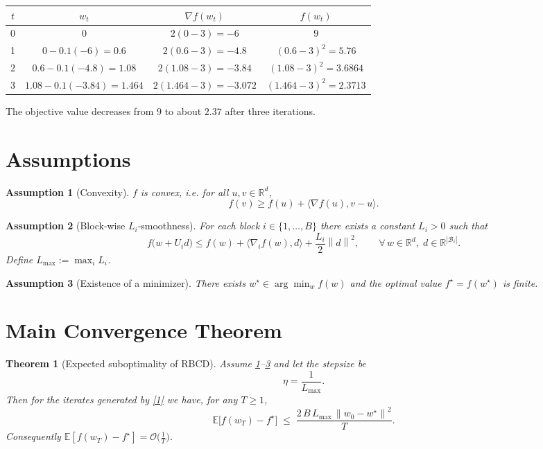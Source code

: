 \documentclass{article}
\newtheorem{theorem}{Theorem}
\newtheorem{assumption}{Assumption}
\newcommand{\E}{\mathbb{E}}
\newcommand{\R}{\mathbb{R}}
\newcommand{\norm}[1]{\left\lVert #1\right\rVert}
\newcommand{\ip}[2]{\langle #1 , #2\rangle}
\newcommand{\block}[1]{U_{#1}}
\begin{document}
\begin{center}
\begin{tabular}{c|c|c|c}
$t$ & $w_{t}$ & $\nabla f(w_{t})$ & $f(w_{t})$ \\ \hline
0 & $0$ & $2(0-3)=-6$ & $9$ \\
1 & $0-0.1(-6)=0.6$ & $2(0.6-3)=-4.8$ & $(0.6-3)^{2}=5.76$ \\
2 & $0.6-0.1(-4.8)=1.08$ & $2(1.08-3)=-3.84$ & $(1.08-3)^{2}=3.6864$ \\
3 & $1.08-0.1(-3.84)=1.464$ & $2(1.464-3)=-3.072$ & $(1.464-3)^{2}=2.3713$
\end{tabular}
\end{center}
The objective value decreases from $9$ to about $2.37$ after three iterations.

\newpage

\section*{Assumptions}
\begin{assumption}[Convexity]\label{as:convex}
$f$ is convex, i.e. for all $u,v\in\R^{d}$,
\[
f(v)\ge f(u)+\ip{\nabla f(u)}{v-u}.
\]
\end{assumption}

\begin{assumption}[Block‑wise $L_{i}$‑smoothness]\label{as:smooth}
For each block $i\in\{1,\dots ,B\}$ there exists a constant $L_{i}>0$ such that
\[
f\bigl(w+\block{i}d\bigr)\le
f(w)+\ip{\nabla_{i}f(w)}{d}+\frac{L_{i}}{2}\norm{d}^{2},
\qquad\forall\,w\in\R^{d},\; d\in\R^{|\mathcal{B}_{i}|}.
\]
Define $L_{\max}:=\max_{i}L_{i}$.
\end{assumption}

\begin{assumption}[Existence of a minimizer]\label{as:opt}
There exists $w^{\star}\in\arg\min_{w}f(w)$ and the optimal value $f^{\star}=f(w^{\star})$ is finite.
\end{assumption}

\section*{Main Convergence Theorem}
\begin{theorem}[Expected suboptimality of RBCD]\label{thm:rate}
Assume \ref{as:convex}–\ref{as:opt} and let the stepsize be
\[
\eta = \frac{1}{L_{\max}} .
\]
Then for the iterates generated by \eqref{1} we have, for any $T\ge 1$,
\[
\E\bigl[f(w_{T})-f^{\star}\bigr]\;\le\;
\frac{2\,B\,L_{\max}\,\norm{w_{0}-w^{\star}}^{2}}{T}.
\tag{2}
\]
Consequently $ \E[f(w_{T})-f^{\star}]=\mathcal{O}\!\bigl(\tfrac{1}{T}\bigr) $.
\end{theorem}
\end{document}
